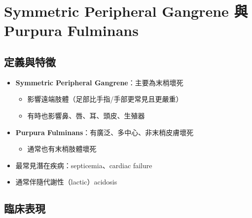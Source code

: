 \documentclass[12pt,a4paper]{article}
\begin{document}

\section{Symmetric Peripheral Gangrene 與 Purpura Fulminans}

\subsection{定義與特徵}

\begin{itemize}
    \item \textbf{Symmetric Peripheral Gangrene}：主要為末梢壞死
    \begin{itemize}
        \item 影響遠端肢體（足部比手指/手部更常見且更嚴重）
        \item 有時也影響鼻、唇、耳、頭皮、生殖器
    \end{itemize}
    \item \textbf{Purpura Fulminans}：有廣泛、多中心、非末梢皮膚壞死
    \begin{itemize}
        \item 通常也有末梢肢體壞死
    \end{itemize}
    \item 最常見潛在疾病：septicemia、cardiac failure
    \item 通常伴隨代謝性（lactic）acidosis
\end{itemize}

\subsection{臨床表現}
\end{document}
